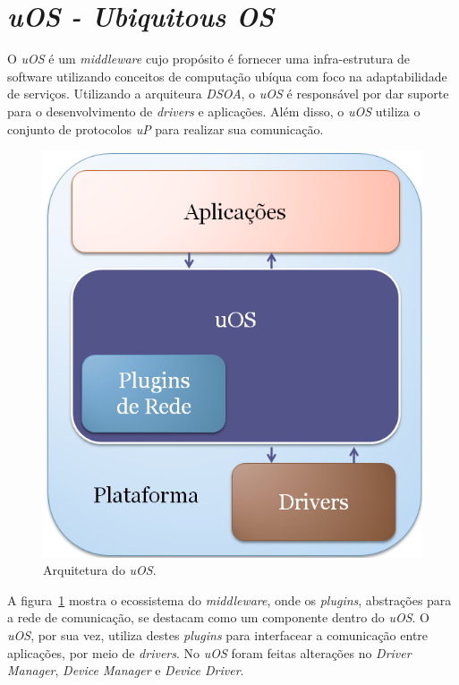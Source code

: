 \section{\emph{uOS - Ubiquitous OS}}

O \emph{uOS} é um \emph{middleware} cujo propósito é fornecer uma infra-estrutura de software utilizando conceitos de computação ubíqua com foco na adaptabilidade de serviços. Utilizando a arquiteura \emph{DSOA}, o \emph{uOS} é responsável por dar suporte para o desenvolvimento de \emph{drivers} e aplicações. Além disso, o \emph{uOS} utiliza o conjunto de protocolos \emph{uP} para realizar sua comunicação.

\begin{figure}[ht]
	\center
	\includegraphics[scale=0.4]{imagens/ecossistemaUbiquitos}
	\caption{Arquitetura do \emph{uOS}.}
	\label{fig:ecossistemaUbiquitos}
\end{figure}

A figura~\ref{fig:ecossistemaUbiquitos} mostra o ecossistema do \emph{middleware}, onde os \emph{plugins}, abstrações para a rede de comunicação, se destacam como um componente dentro do \emph{uOS}. O \emph{uOS}, por sua vez, utiliza destes \emph{plugins} para interfacear a comunicação entre aplicações, por meio de \emph{drivers}. No \emph{uOS} foram feitas alterações no \emph{Driver Manager}, \emph{Device Manager} e \emph{Device Driver}.

